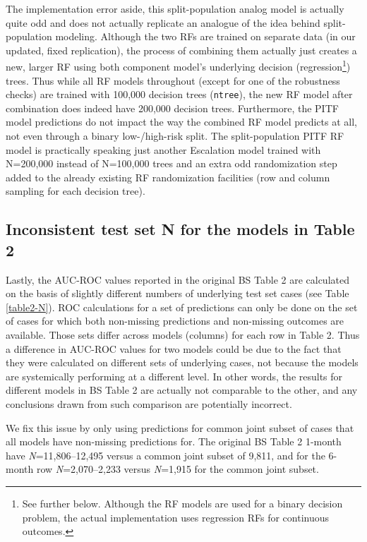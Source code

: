 \documentclass[]{article}
\let\rmarkdownfootnote\footnote%
\def\footnote{\protect\rmarkdownfootnote}
\begin{document}
The implementation error aside, this split-population analog model is
actually quite odd and does not actually replicate an analogue of the
idea behind split-population modeling. Although the two RFs are trained
on separate data (in our updated, fixed replication), the process of
combining them actually just creates a new, larger RF using both
component model's underlying decision (regression\footnote{See further
  below. Although the RF models are used for a binary decision problem,
  the actual implementation uses regression RFs for continuous outcomes.})
trees. Thus while all RF models throughout (except for one of the
robustness checks) are trained with 100,000 decision trees
(\texttt{ntree}), the new RF model after combination does indeed have
200,000 decision trees. Furthermore, the PITF model predictions do not
impact the way the combined RF model predicts at all, not even through a
binary low-/high-risk split. The split-population PITF RF model is
practically speaking just another Escalation model trained with
N=200,000 instead of N=100,000 trees and an extra odd randomization step
added to the already existing RF randomization facilities (row and
column sampling for each decision tree).

\hypertarget{inconsistent-test-set-n-for-the-models-in-table-2}{%
\subsection{Inconsistent test set N for the models in Table
2}\label{inconsistent-test-set-n-for-the-models-in-table-2}}

Lastly, the AUC-ROC values reported in the original BS Table 2 are
calculated on the basis of slightly different numbers of underlying test
set cases (see Table \ref{table2-N}). ROC calculations for a set of
predictions can only be done on the set of cases for which both
non-missing predictions and non-missing outcomes are available. Those
sets differ across models (columns) for each row in Table 2. Thus a
difference in AUC-ROC values for two models could be due to the fact
that they were calculated on different sets of underlying cases, not
because the models are systemically performing at a different level. In
other words, the results for different models in BS Table 2 are actually
not comparable to the other, and any conclusions drawn from such
comparison are potentially incorrect.

We fix this issue by only using predictions for common joint subset of
cases that all models have non-missing predictions for. The original BS
Table 2 1-month have \emph{N}=11,806--12,495 versus a common joint
subset of 9,811, and for the 6-month row \emph{N}=2,070--2,233 versus
\emph{N}=1,915 for the common joint subset.
\end{document}
